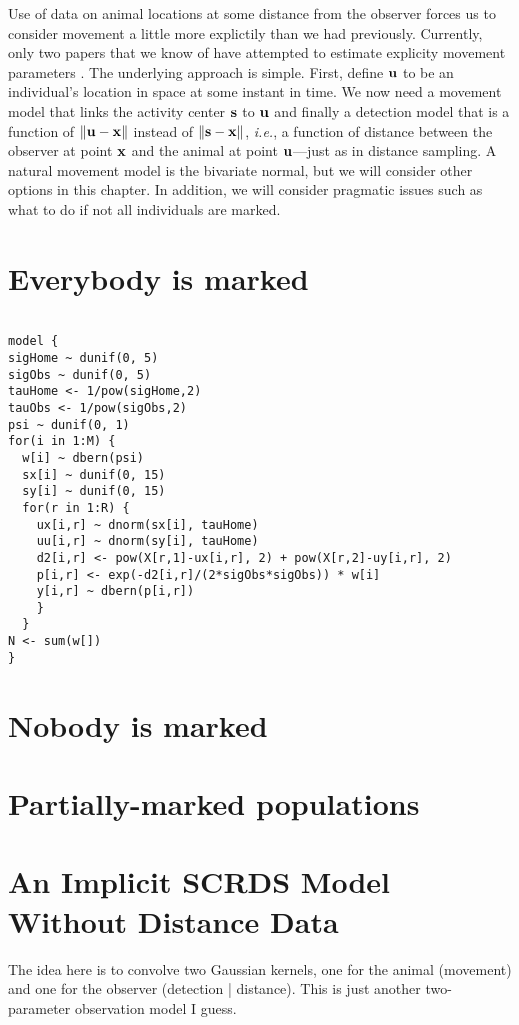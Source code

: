 Use of data on animal locations at some distance from the observer
forces us to consider movement a little more explictily than we had
previously. Currently, only two papers that we know of have attempted
to estimate explicity movement parameters
\citep{royle_young:2008,royle_etal:2009jae}. The underlying approach
is simple. First, define $\bf u$ to be an individual's location in
space at some instant in time. We now need a movement model that links
the activity center $\bf s$ to $\bf u$ and finally a detection model that
is a function of $\bf \| u - x\|$ instead of $\bf \|s - x\|$,
\emph{i.e.}, a function of distance between the observer
at point $\bf x$ and the animal at point $\bf u$---just as in distance
sampling. A natural movement model is the bivariate normal, but we
will consider other options in this chapter. In addition, we will
consider pragmatic issues such as what to do if not all individuals
are marked.







\section{Everybody is marked}



\begin{verbatim}

model {
sigHome ~ dunif(0, 5)
sigObs ~ dunif(0, 5)
tauHome <- 1/pow(sigHome,2)
tauObs <- 1/pow(sigObs,2)
psi ~ dunif(0, 1)
for(i in 1:M) {
  w[i] ~ dbern(psi)
  sx[i] ~ dunif(0, 15)
  sy[i] ~ dunif(0, 15)
  for(r in 1:R) {
    ux[i,r] ~ dnorm(sx[i], tauHome)
    uu[i,r] ~ dnorm(sy[i], tauHome)
    d2[i,r] <- pow(X[r,1]-ux[i,r], 2) + pow(X[r,2]-uy[i,r], 2)
    p[i,r] <- exp(-d2[i,r]/(2*sigObs*sigObs)) * w[i]
    y[i,r] ~ dbern(p[i,r])
    }
  }
N <- sum(w[])
}

\end{verbatim}







\section{Nobody is marked}





\section{Partially-marked populations}





\section{An Implicit SCRDS Model Without Distance Data}

The idea here is to convolve two Gaussian kernels, one for the animal
(movement) and one for the observer (detection | distance). This is
just another two-parameter observation model I guess.

